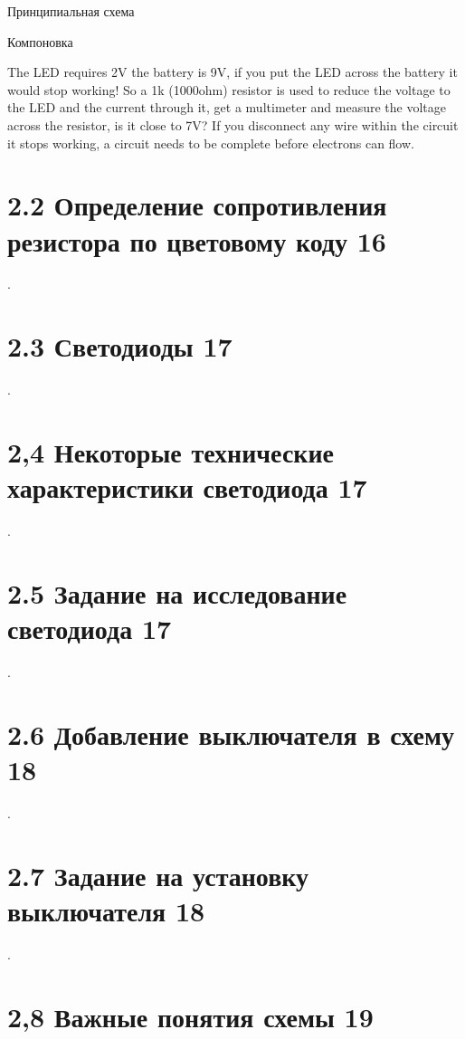 \bigskip
Принципиальная схема \label{ch21sch}

\bigskip
Компоновка \label{ch21lay}

\bigskip
The LED requires 2V the battery is 9V, if you put the LED across the battery it
would stop working! So a 1k (1000ohm) resistor is used to reduce the voltage to
the LED and the current through it, get a multimeter and measure the voltage
across the resistor, is it close to 7V? If you disconnect any wire within the
circuit it stops working, a circuit needs to be complete before electrons can
flow.

\section{2.2 Определение сопротивления резистора по цветовому коду 16}

.

\section{2.3 Светодиоды 17}

.

\section{2,4 Некоторые технические характеристики светодиода 17}

.

\section{2.5 Задание на исследование светодиода 17}

.

\section{2.6 Добавление выключателя  в схему 18}

.

\section{2.7 Задание на установку выключателя 18}

.

\section{2,8 Важные понятия схемы 19}

